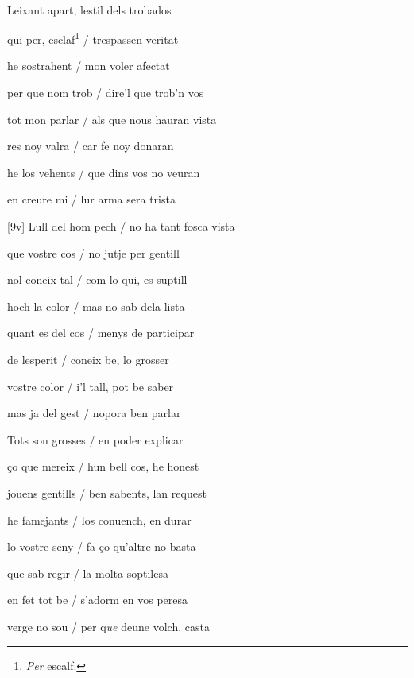 \documentclass[12pt]{article}
\renewcommand{\espaiAbansEtiquetaPoema}{\vspace{0ex}}
\begin{document}
\begin{estrofa}

\espaiAbansEtiquetaPoema

\\

\end{estrofa}


\begin{estrofa}

 Leixant apart, lestil dels trobados

 qui per, esclaf\footnote{\textit{Per} escalf.} / trespassen veritat

 he sostrahent / mon voler afectat

 per que nom trob / dire'l que trob'n vos

 tot mon parlar / als que nous hauran vista

 res noy valra / car fe noy donaran

 he los vehents / que dins vos no veuran

 en creure mi / lur arma sera trista

\end{estrofa}



\begin{estrofa}

 [9v] Lull del hom pech / no ha tant fosca vista

 que vostre cos / no jutje per gentill

 nol coneix tal / com lo qui, es suptill

 hoch la color / mas no sab dela lista

 quant es del cos / menys de participar

 de lesperit / coneix be, lo grosser

 vostre color / i'l tall, pot be saber

 mas ja del gest / nopora ben parlar

\end{estrofa}



\begin{estrofa}

 Tots son grosses / en poder explicar

 \c{c}o que mereix / hun bell cos, he honest

 jouens gentills / ben sabents, lan request

 he famejants / los conuench, en durar

 lo vostre seny / fa \c{c}o qu'altre no basta

 que sab regir / la molta soptilesa

 en fet tot be / s'adorm en vos peresa

 verge no sou / per q\textit{ue} deune volch, casta

\end{estrofa}
\end{document}

